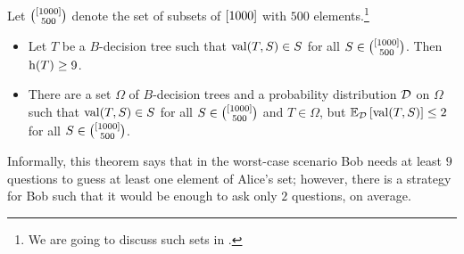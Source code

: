 \begin{theorem}
\label{theorem:guess-one-out-of-many}
  Let $\binom{\range{1000}}{500}$ denote the set of subsets of $\range{1000}$
  with $500$ elements.\footnote{%
    We are going to discuss such sets in .
  }
  \begin{itemize}
    \item Let $T$ be a $B$-decision tree such that $\DTValue{T}{S} \in S$
      for all $S \in \binom{\range{1000}}{500}$. Then $\DTHeight{T} \ge 9$.
    \item There are a set $\Omega$ of $B$-decision trees and a probability
      distribution $\Distribution{D}$ on $\Omega$ such that 
      $\DTValue{T}{S} \in S$ for all $S \in \binom{\range{1000}}{500}$ and 
      $T \in \Omega$, but 
      $\expectation[\Distribution{D}]{\DTValue{T}{S}} \le 2$ for all 
      $S \in \binom{\range{1000}}{500}$.
  \end{itemize}
\end{theorem}
Informally, this theorem says that in the worst-case scenario Bob needs at least
$9$ questions to guess at least one element of Alice's set; however, there is 
a strategy for Bob such that it would be enough to ask only $2$ questions, on
average.
